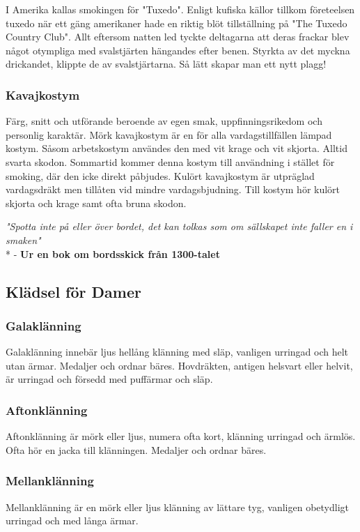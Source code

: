 I Amerika kallas smokingen för "Tuxedo". Enligt kufiska källor tillkom företeelsen tuxedo när ett gäng amerikaner hade en riktig blöt tillställning på "The Tuxedo Country Club". Allt eftersom natten led tyckte deltagarna att deras frackar blev något otympliga med svalstjärten hängandes efter benen. Styrkta av det myckna drickandet, klippte de av svalstjärtarna. Så lätt skapar man ett nytt plagg!

\subsubsection*{\textbf{Kavajkostym}}

Färg, snitt och utförande beroende av egen smak, uppfinningsrikedom och personlig karaktär. Mörk kavajkostym är en för alla vardagstillfällen lämpad kostym. Såsom arbetskostym användes den med vit krage och vit skjorta. Alltid svarta skodon. Sommartid kommer denna kostym till användning i stället för smoking, där den icke direkt påbjudes. Kulört kavajkostym är utpräglad vardagsdräkt men tillåten vid mindre vardagsbjudning. Till kostym hör kulört skjorta och krage samt ofta bruna skodon.

\textit{"Spotta inte på eller över bordet, det kan tolkas som om sällskapet inte faller en i smaken"}\\* - \textbf{Ur en bok om bordsskick från 1300-talet}

\subsection*{\textbf{Klädsel för Damer}}
\subsubsection*{\textbf{Galaklänning}}
Galaklänning innebär ljus hellång klänning med släp, vanligen urringad och helt utan ärmar. Medaljer och ordnar bäres. Hovdräkten, antigen helsvart eller helvit, är urringad och försedd med puffärmar och släp.

\subsubsection*{\textbf{Aftonklänning}}
Aftonklänning är mörk eller ljus, numera ofta kort, klänning urringad och ärmlös. Ofta hör en jacka till klänningen. Medaljer och ordnar bäres.

\subsubsection*{\textbf{Mellanklänning}}
Mellanklänning är en mörk eller ljus klänning av lättare tyg, vanligen obetydligt urringad och med långa ärmar.

